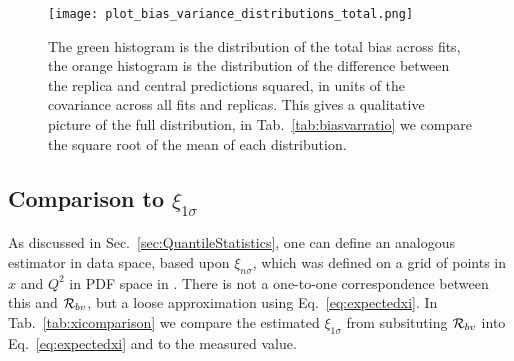 \begin{figure}
    \centering
    \texttt{[image: plot\_bias\_variance\_distributions\_total.png]}
    \caption{The green histogram is the distribution of the total bias across fits,
    the orange histogram is the distribution of the difference between the
    replica and central predictions squared, in units of the covariance
    across all fits and replicas. This gives a qualitative picture of the full
    distribution, in Tab.~\ref{tab:biasvarratio} we compare the square root of the
    mean of each distribution.}
\end{figure}

\subsection{Comparison to $\xi_{1\sigma}$}

As discussed in Sec.~\ref{sec:QuantileStatistics}, one can define an analogous
estimator in data space, based upon $\xi_{n\sigma}$, which was defined on a grid
of points in $x$ and $Q^2$ in PDF space in \cite{nnpdf30}. There is not
a one-to-one correspondence
between this and $\mathcal{R}_{bv}$, but a loose approximation using
Eq.~\ref{eq:expectedxi}. In Tab.~\ref{tab:xicomparison} we compare the estimated
$\xi_{1\sigma}$ from
subsituting $\mathcal{R}_{bv}$ into Eq.~\ref{eq:expectedxi} and to the
measured value.

